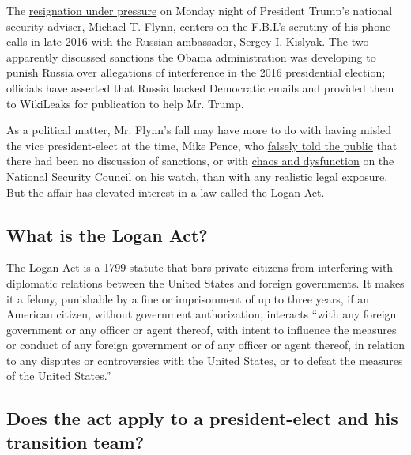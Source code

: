 The
\href{https://www.nytimes.com/2017/02/13/us/politics/donald-trump-national-security-adviser-michael-flynn.html}{resignation
under pressure} on Monday night of President Trump's national security
adviser, Michael T. Flynn, centers on the F.B.I.'s scrutiny of his phone
calls in late 2016 with the Russian ambassador, Sergey I. Kislyak. The
two apparently discussed sanctions the Obama administration was
developing to punish Russia over allegations of interference in the 2016
presidential election; officials have asserted that Russia hacked
Democratic emails and provided them to WikiLeaks for publication to help
Mr. Trump.

As a political matter, Mr. Flynn's fall may have more to do with having
misled the vice president-elect at the time, Mike Pence, who
\href{http://www.cbsnews.com/news/face-the-nation-transcript-january-15-2017-pence-manchin-gingrich/}{falsely
told the public} that there had been no discussion of sanctions, or with
\href{https://www.nytimes.com/2017/02/12/us/politics/national-security-council-turmoil.html}{chaos
and dysfunction} on the National Security Council on his watch, than
with any realistic legal exposure. But the affair has elevated interest
in a law called the Logan Act.

\hypertarget{what-is-the-logan-act-1}{%
\subsection{What is the Logan Act?}\label{what-is-the-logan-act-1}}

The Logan Act is \href{https://www.law.cornell.edu/uscode/text/18/953}{a
1799 statute} that bars private citizens from interfering with
diplomatic relations between the United States and foreign governments.
It makes it a felony, punishable by a fine or imprisonment of up to
three years, if an American citizen, without government authorization,
interacts ``with any foreign government or any officer or agent thereof,
with intent to influence the measures or conduct of any foreign
government or of any officer or agent thereof, in relation to any
disputes or controversies with the United States, or to defeat the
measures of the United States.''

\hypertarget{does-the-act-apply-to-a-president-elect-and-his-transition-team}{%
\subsection{Does the act apply to a president-elect and his transition
team?}\label{does-the-act-apply-to-a-president-elect-and-his-transition-team}}

